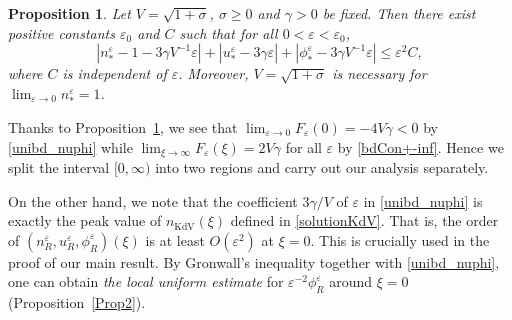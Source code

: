 \documentclass{amsart}
\newcommand{\veps}{\varepsilon}
\numberwithin{equation}{section}
\theoremstyle{plain}%
\newtheorem{proposition}[theorem]{Proposition}
\theoremstyle{definition}
\theoremstyle{remark}
\theoremstyle{remark}
\begin{document}
\begin{proposition}\label{cor2}
Let $V=\sqrt{1+\sigma}$,  $\sigma \geq 0$ and $\gamma>0$ be fixed.
Then there exist positive constants $\veps_0$ and $C$ such that for all $0 < \veps< \veps_0$, 
\begin{equation}\label{unibd_nuphi}
\left| n_\ast^\veps - 1 - 3\gamma V^{-1}\veps \right| + \left|u^\veps_\ast - 3\gamma\veps \right| + \left| \phi^\veps_\ast - 3\gamma V^{-1}\veps \right| \leq \veps^2C,
\end{equation}
where $C$ is independent of $\veps$.
Moreover, $V= \sqrt{1+\sigma}$ is necessary for $\lim_{\veps\to 0}n_\ast^\veps = 1$.
\end{proposition}

 Thanks to Proposition~\ref{cor2}, we see 
that  $\lim_{\veps \to 0}F_\veps(0)=-4V\gamma<0$ by \eqref{unibd_nuphi} while $\lim_{\xi \to \infty}F_\veps(\xi)=2V\gamma$ for all $\veps$ by \eqref{bdCon+-inf}. Hence we  split the interval $[0,\infty)$ into two regions and carry out our analysis separately. 

On the other hand, we note that the coefficient $3\gamma/V$ of $\veps$ in \eqref{unibd_nuphi} is exactly the peak value of $n_{\text{KdV}}(\xi)$ defined in \eqref{solutionKdV}. That is, the order of $(n_R^\veps,u_R^\veps,\phi_R^\veps)(\xi)$ is at least $O(\veps^2)$  at $\xi=0$. This is crucially used in the proof of our main result. By Gronwall's inequality together with \eqref{unibd_nuphi}, one can obtain \textit{the local uniform estimate} for $\veps^{-2}\phi_R^\veps$ around $\xi=0$ (Proposition~\ref{Prop2}).
\end{document}

